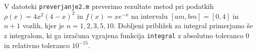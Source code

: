 \documentclass[a4paper,12pt]{article}
\begin{document}
V datoteki \texttt{preverjanje2.m} preverimo rezultate metod pri podatkih 
$\rho(x)=4x^2(4-x)^2$ in $f(x)=xe^{-x}$ na intervalu $[am,bm]=[0,4]$ in $n+1$ vozlih,
kjer je $n=1,2,3,5,10$. Dobljeni približek za integral primerjamo še z integralom, ki ga 
izračuna vgrajena funkcija \texttt{integral} z absolutno toleranco $0$ in relativno toleranco $10^{-15}$.



\end{document}
